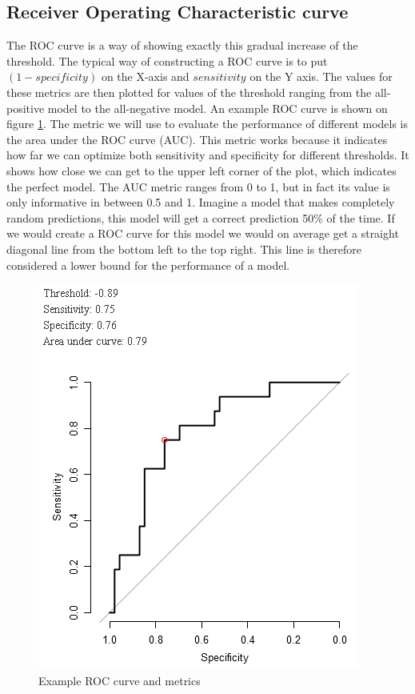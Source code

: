 \subsection{Receiver Operating Characteristic curve}
The ROC curve is a way of showing exactly this gradual increase of the threshold. The typical way of constructing a ROC curve is to put $(1-specificity)$ on the X-axis and $sensitivity$ on the Y axis. The values for these metrics are then plotted for values of the threshold ranging from the all-positive model to the all-negative model. An example ROC curve is shown on figure \ref{fig:evaluation-roc}. The metric we will use to evaluate the performance of different models is the area under the ROC curve (AUC). This metric works because it indicates how far we can optimize both sensitivity and specificity for different thresholds. It shows how close we can get to the upper left corner of the plot, which indicates the perfect model. The AUC metric ranges from 0 to 1, but in fact its value is only informative in between 0.5 and 1. Imagine a model that makes completely random predictions, this model will get a correct prediction 50\% of the time. If we would create a ROC curve for this model we would on average get a straight diagonal line from the bottom left to the top right. This line is therefore considered a lower bound for the performance of a model.
\begin{figure}
	\centering
	\includegraphics[scale=.9]{images/roc_curve}
	\caption{Example ROC curve and metrics}
	\label{fig:evaluation-roc}
\end{figure}

